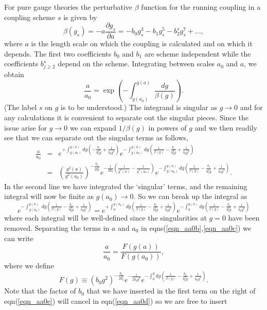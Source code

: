 \documentclass[12pt]{article}
\newcommand{\be}{\begin{equation}}
\newcommand{\ee}{\end{equation}}
\newcommand{\beq}{\begin{eqnarray}}
\newcommand{\eeq}{\end{eqnarray}}
\begin{document}
\begin{appendix}
For pure gauge theories the perturbative $\beta$ function for the running coupling
in a coupling scheme $s$ is given by
%
\be
\beta(g_s)
=
-a\frac{\partial g_s}{\partial a}
=
-b_0  g^3_s - b_1  g^5_s - b^s_2  g^7_s + ...,
\label{eqn_bfunction2}
\ee
%
where $a$ is the length scale on which the coupling is calculated and on which it
depends.  The first two coefficients $b_0$ and $b_1$ are scheme independent while the
coefficients $b^s_{j\geq 2}$ depend on the scheme. Integrating between scales $a_0$
and $a$, we obtain
%
\be
\frac{a}{a_0} 
=
\exp{\left(-\int^{g(a)}_{g(a_0)} \frac{dg}{\beta(g)}\right)}.
\label{eqn_aa0}
\ee
%
(The label $s$ on $g$ is to be understood.)
The integrand is singular as $g\to 0$ and for any calculations it is convenient
to separate out the singular pieces. Since the issue arise for  $g\to 0$ we
can expand $1/\beta(g)$ in powers of $g$ and we then readily see that we can
separate out the singular terms as follows,
%
\beq
\frac{a}{a_0} 
& = &
e^{+\int^{g(a)}_{g(a_0)} dg \left(
 - \frac{b_1}{b^2_0 g} + \frac{1}{b_0 g^3}
 \right) }
e^{-\int^{g(a)}_{g(a_0)} dg \left(\frac{1}{\beta(g)}
 - \frac{b_1}{b^2_0 g} + \frac{1}{b_0 g^3}
 \right) }       \nonumber \\
& = &
\left(\frac{g^2(a)}{g^2(a_0)}\right)^{-\frac{b_1}{2b^2_0}}
e^{-\frac{1}{2b_0}\left(\frac{1}{g^2(a)}-\frac{1}{g^2(a_0)}\right)}
e^{-\int^{g(a)}_{g(a_0)} dg \left(\frac{1}{\beta(g)}
 - \frac{b_1}{b^2_0 g} + \frac{1}{b_0 g^3}
 \right) }.
\label{eqn_aa0b}
\eeq
%
In the second line we have integrated the `singular' terms, and the remaining
integral will now be finite as $g(a_0) \to 0$. So we can break up the integral as
%
\be
e^{-\int^{g(a)}_{g(a_0)} dg \left(\frac{1}{\beta(g)}
 - \frac{b_1}{b^2_0 g} + \frac{1}{b_0 g^3}
 \right) }
=
e^{+\int^{g(a_0)}_0 dg \left(\frac{1}{\beta(g)}
 - \frac{b_1}{b^2_0 g} + \frac{1}{b_0 g^3}
 \right) }
e^{-\int^{g(a)}_0 dg \left(\frac{1}{\beta(g)}
 - \frac{b_1}{b^2_0 g} + \frac{1}{b_0 g^3}
 \right) }
\label{eqn_aa0c}
\ee
where each integral will be well-defined since the singularities at $g=0$
have been removed. Separating the terms in $a$ and $a_0$ in
eqns(\ref{eqn_aa0b},\ref{eqn_aa0c}) we can write
%
\be
\frac{a}{a_0}  = \frac{F(g(a))}{F(g(a_0))},
\label{eqn_aa0d}
\ee
%
where we define
%
\be
F(g)
\equiv
\left(b_0g^2\right)^{-\frac{b_1}{2b^2_0}}
e^{-\frac{1}{2b_0g^2}}
e^{-\int^{g}_0 dg \left(\frac{1}{\beta(g)}
 - \frac{b_1}{b^2_0 g} + \frac{1}{b_0 g^3}
 \right) }.
\label{eqn_aa0e}
\ee
%
Note that the factor of $b_0$ that we have inserted in the first term on the right
of eqn(\ref{eqn_aa0e}) will cancel in eqn(\ref{eqn_aa0d}) so we are free to insert

\end{appendix}
\end{document}
